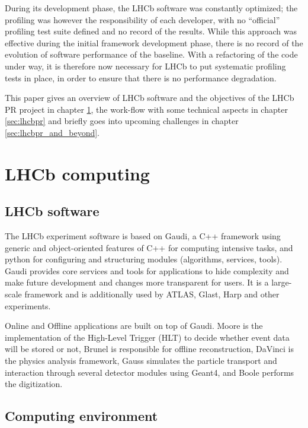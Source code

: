 \documentclass[a4paper]{jpconf}
\begin{document}
During its development phase, the LHCb software was constantly optimized; the profiling was however the responsibility of each developer, with no ``official'' profiling test suite defined and no record of the results. While this approach was effective during the initial framework development phase, there is no record of the evolution of software performance of the baseline. With a refactoring of the code under way, it is therefore now necessary for LHCb to put systematic profiling tests in place, in order to ensure that there is no performance degradation.

This paper gives an overview of LHCb software and the objectives of the LHCb PR project in chapter \ref{sec:lhcb_computing}, the work-flow with some technical aspects in chapter \ref{sec:lhcbpr} and briefly goes into upcoming challenges in chapter \ref{sec:lhcbpr_and_beyond}.

\section{LHCb computing}
\label{sec:lhcb_computing}

\subsection{LHCb software}
\label{sec:lhcb_software}

The LHCb experiment software is based on Gaudi\cite{gaudi}, a C++ framework using generic and object-oriented features of C++ for computing intensive tasks, and python for configuring and structuring modules (algorithms, services, tools). Gaudi provides core services and tools for applications to hide complexity and make future development and changes more transparent for users. It is a large-scale framework and is additionally used by ATLAS, Glast, Harp and other experiments.

Online and Offline applications are built on top of Gaudi. Moore is the implementation of the High-Level Trigger (HLT) to decide whether event data will be stored or not, Brunel is responsible for offline reconstruction, DaVinci is the physics analysis framework, Gauss simulates the particle transport and interaction through several detector modules using Geant4, and Boole performs the digitization.

\subsection{Computing environment}
\label{sec:computing_environment}
\end{document}
